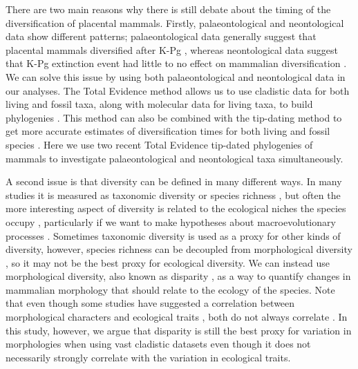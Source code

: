 \documentclass[12pt,letterpaper]{article}
\begin{document}
There are two main reasons why there is still debate about the timing of the diversification of placental mammals. 
Firstly, palaeontological and neontological data show different patterns; palaeontological data generally suggest that placental mammals diversified after K-Pg \citep[e.g.][]{OLeary08022013}, whereas neontological data suggest that K-Pg extinction event had little to no effect on mammalian diversification \citep{bininda2007delayed,meredithimpacts2011,Stadler12042011}.
We can solve this issue by using both palaeontological and neontological data in our analyses. 
The Total Evidence method allows us to use cladistic data for both living and fossil taxa, along with molecular data for living taxa, to build phylogenies \citep{ronquista2012}. %
This method can also be combined with the tip-dating method \citep{ronquista2012,Wood01032013} to get more accurate estimates of diversification times for both living and fossil species \citep[but see][]{Arcila2015131}.
Here we use two recent Total Evidence tip-dated phylogenies of mammals \citep{Slater2012MEE,beckancient2014} to investigate palaeontological and neontological taxa simultaneously.

A second issue is that diversity can be defined in many different ways.
In many studies it is measured as taxonomic diversity or species richness \citep{Stadler12042011,meredithimpacts2011,OLeary08022013}, but often the more interesting aspect of diversity is related to the ecological niches the species occupy \citep{Wesley-Hunt2005,Brusatte12092008,toljagictriassic-jurassic2013}, particularly if we want to make hypotheses about macroevolutionary processes \citep{Pearman2008149,OlsonRadiation,Losos2010,glor2010phylogenetic,benton2015}.
Sometimes taxonomic diversity is used as a proxy for other kinds of diversity, however, species richness can be decoupled from morphological diversity \citep[e.g.][]{slaterCetacean,ruta2013,hopkinsdecoupling2013}, so it may not be the best proxy for ecological diversity.
We can instead use morphological diversity, also known as disparity \citep[e.g.][]{Wills1994,Erwin2007,Hughes20082013}, as a way to quantify changes in mammalian morphology that should relate to the ecology of the species.
Note that even though some studies have suggested a correlation between morphological characters and ecological traits \citep[e.g.][]{Grossnickle2013}, both do not always correlate \citep[e.g.][]{anderson2012using}.
In this study, however, we argue that disparity is still the best proxy for variation in morphologies when using vast cladistic datasets even though it does not necessarily strongly correlate with the variation in ecological traits.
\end{document}
